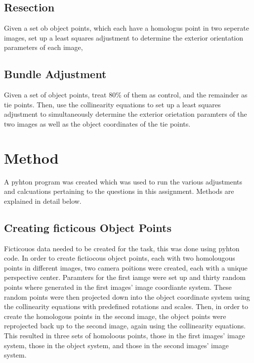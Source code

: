 \documentclass{article}
\begin{document}
\subsection{Resection}
Given a set ob object points, which each have a homologus point in two seperate images, set up a least squares adjustment
to determine the exterior orientation parameters of each image,

\subsection{Bundle Adjustment}
Given a set of object points, treat 80\% of them as control, and the remainder as tie points.
Then, use the collinearity equations to set up a least squares adjustment to simultaneously determine the exterior
orietation paramters of the two images as well as the object coordinates of the tie points.

\newpage

\section{Method}
A pyhton program was created which was used to run the various adjustments and calcuations pertaining to the questions
in this assignment. Methods are explained in detail below.

\subsection{Creating ficticous Object Points}
Ficticouos data needed to be created for the task, this was done using pyhton code.
In order to create fictiocous object points, each with two homolougous points in different images,
two camera poitions were created, each with a unique perspective center.
Paramters for the first iamge were set up and thirty random points where generated in the first images' image coordiante system.
These random points were then projected down into the object coordinate system using the collinearity equations with
predefined rotations and scales. Then, in order to create the homologous points in the second image, the object points were
reprojected back up to the second image, again using the collinearity equations.
This resulted in three sets of homoloous points, those in the first images' image system, those in the object system,
and those in the second images' image system.
\end{document}
